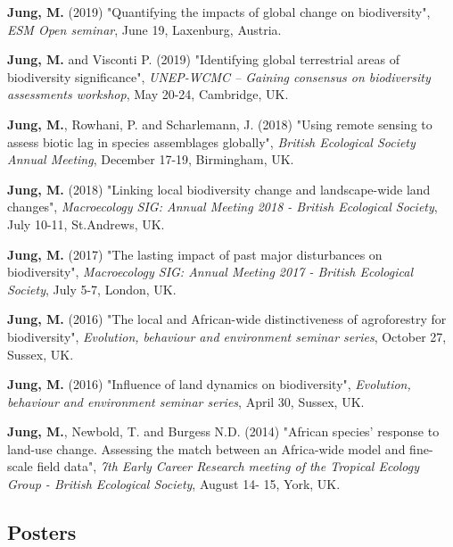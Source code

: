 \documentclass[12pt,a4paper,serif]{moderncv}        %
\begin{document}
\begin{bibenum}

    \item \textbf{Jung, M.} (2019) "Quantifying the impacts of global change on biodiversity", \emph{ESM Open seminar}, June 19, Laxenburg, Austria. 
    
    \item \textbf{Jung, M.} and Visconti P. (2019) "Identifying global terrestrial areas of biodiversity significance", \emph{UNEP-WCMC – Gaining consensus on biodiversity assessments workshop}, May 20-24, Cambridge, UK. 
    
    \item \textbf{Jung, M.}, Rowhani, P. and Scharlemann, J. (2018) "Using remote sensing to assess biotic lag in species assemblages globally", \emph{British Ecological Society Annual Meeting}, December 17-19, Birmingham, UK. 
    
    \item \textbf{Jung, M.} (2018) "Linking local biodiversity change and landscape-wide land changes", \emph{Macroecology SIG: Annual Meeting 2018 - British Ecological Society}, July 10-11, St.Andrews, UK.

    \item \textbf{Jung, M.} (2017) "The lasting impact of past major disturbances on biodiversity", \emph{Macroecology SIG: Annual Meeting 2017 - British Ecological Society}, July 5-7, London, UK.

    \item \textbf{Jung, M.} (2016) "The local and African-wide distinctiveness of agroforestry for biodiversity", \emph{Evolution, behaviour and environment seminar series}, October 27, Sussex, UK.

    \item \textbf{Jung, M.} (2016) "Influence of land dynamics on biodiversity", \emph{Evolution, behaviour and environment seminar series}, April 30, Sussex, UK.

    \item \textbf{Jung, M.}, Newbold, T. and Burgess N.D. (2014) "African species' response to land-use change. Assessing the match between an Africa-wide model and fine-scale field data", \emph{7th Early Career Research meeting of the Tropical Ecology Group - British Ecological Society}, August 14- 15, York, UK.

\end{bibenum}

\vspace{6pt}
\subsection{Posters}
\end{document}
